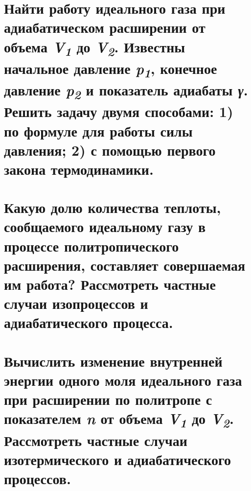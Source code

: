 






\section{Найти работу идеального газа при адиабатическом расширении
от объема \emph{V\textsubscript{1}} до \emph{V\textsubscript{2}}.
Известны начальное давление \emph{p\textsubscript{1}}, конечное давление
\emph{p\textsubscript{2}} и показатель адиабаты \emph{γ}. Решить задачу
двумя способами:
  1) по формуле для работы силы давления;
  2) с помощью первого закона термодинамики.
}

\section{Какую долю количества теплоты, сообщаемого идеальному газу в процессе политропического расширения, составляет совершаемая им работа? Рассмотреть частные случаи изопроцессов и адиабатического процесса.}

\section{Вычислить изменение внутренней энергии одного моля идеального газа при расширении по политропе с показателем \emph{n} от объема \emph{V\textsubscript{1}} до \emph{V\textsubscript{2}}. Рассмотреть частные случаи изотермического и адиабатического процессов.}

